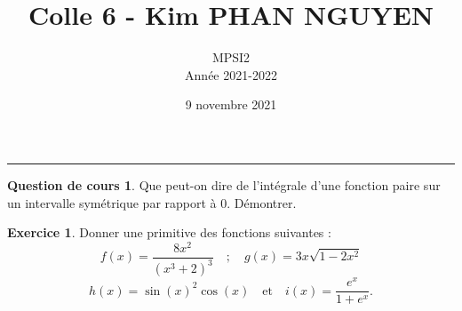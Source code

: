 \documentclass[a4paper, 11pt,openany]{article}%
\title{Colle 6 - Kim PHAN NGUYEN}
\author{MPSI2\\
Année 2021-2022}
\date{9 novembre 2021}
\theoremstyle{plain}
\theoremstyle{definition}
\newtheorem{cours}{Question de cours}
\newtheorem{exo}{Exercice}
\newtheorem{sol}{Solution de l'exercice}
\theoremstyle{remark}
\begin{document}
   \maketitle
      \rule{\linewidth}{0.5mm}


\begin{cours}
Que peut-on dire de l'intégrale d'une fonction paire sur un intervalle symétrique par rapport à $0$. Démontrer.
\end{cours}

\begin{exo}
Donner une primitive des fonctions suivantes :
\[ f(x) = \frac{8x^2}{(x^3+2)^3}\quad ; \quad g(x) =  3x\sqrt{1 - 2x^2}\]
\[ h(x) = \sin(x)^2\cos(x)\quad \text{et} \quad i(x) = \frac{e^x}{1+e^x}.\]
\end{exo}

\end{document}

